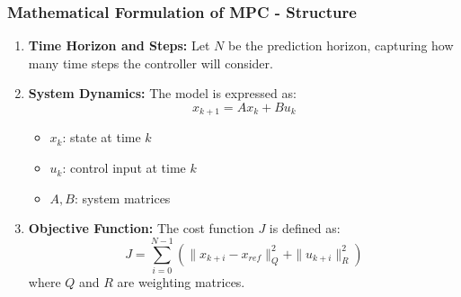 \documentclass[aspectratio=169]{beamer}
\begin{document}
\begin{frame}[fragile]
    \frametitle{Mathematical Formulation of MPC - Structure}
    \begin{enumerate}
        \item \textbf{Time Horizon and Steps:}     
        Let \( N \) be the prediction horizon, capturing how many time steps the controller will consider.

        \item \textbf{System Dynamics:} The model is expressed as:
        \begin{equation}
        x_{k+1} = Ax_k + Bu_k
        \end{equation}
        \begin{itemize}
            \item \( x_k \): state at time \( k \)
            \item \( u_k \): control input at time \( k \)
            \item \( A, B \): system matrices
        \end{itemize}

        \item \textbf{Objective Function:} The cost function \( J \) is defined as:
        \begin{equation}
        J = \sum_{i=0}^{N-1} \left( \|x_{k+i} - x_{ref}\|_Q^2 + \|u_{k+i}\|_R^2 \right)
        \end{equation}
        where \( Q \) and \( R \) are weighting matrices.
    \end{enumerate}
\end{frame}
\end{document}
